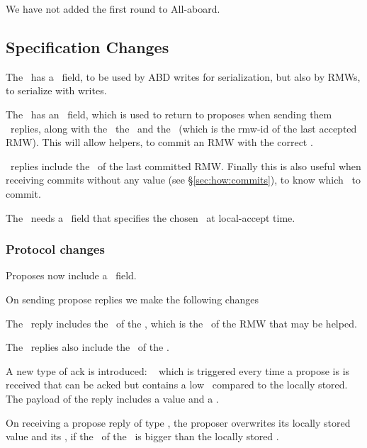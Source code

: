 We have not added the first round to All-aboard. %

\subsection{Specification Changes}

\custvspace{}
\squishlist
\item The \kv~has a \basets~field, to be used by ABD writes for serialization, but also by RMWs, to serialize with writes.
\item The \kv~has an \accbasets~field, which is used to return to proposes when sending them \lowacc~replies, along with the \accts~the \accval~and the \rmw~(which is the rmw-id of the last accepted RMW). This will allow helpers, to commit an RMW with the correct \basets.
\item \loglow~replies include the \basets~of the last committed RMW. Finally this is also useful when receiving commits without any value (see \S\ref{sec:how:commits}), to know which \basets~to commit.

\item The \locentry~needs a \basets~field that specifies the chosen \basets~at local-accept time.
\squishend

\subsubsection{Protocol changes}

\custvspace{}
Proposes now include a \basets~field. 

\custvspace{}
On sending propose replies we make the following changes
\squishlist
\item The \lowacc~reply includes the \accbasets~of the \kv, which is the \basets~of the RMW that may be helped.
\item The \loglow~replies also include the \basets~of the \kv. 
\item A new type of ack is introduced: \ackbase~ which is triggered every time  a propose is is received that can be acked but contains a low \basets~compared to the locally stored. The payload of the reply includes a value and a \basets. 
\squishend

On receiving a propose reply of type \ackbase, the proposer overwrites its locally stored value and its \basets, if the \basets~of the \ackbase~is bigger than the locally stored \basets. 

